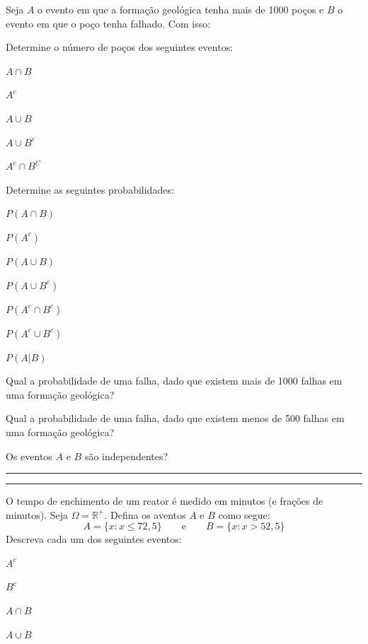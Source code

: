\documentclass[a4paper,11pt,fleqn]{article}\usepackage[]{graphicx}\usepackage[]{color}
\theoremstyle{definition}
\begin{document}
\begin{compactenum}
  Seja $A$ o evento em que a formação geológica tenha mais de 1000 poços
  e $B$ o evento em que o poço tenha falhado. Com isso:
  \begin{compactenum}
  \item Determine o número de poços dos seguintes eventos: \\
    \begin{inparaenum}
    \item $A \cap B$ \,
    \item $A^c$ \,
    \item $A \cup B$ \,
    \item $A \cup B^c$ \,
    \item $A^c \cap B^C$
    \end{inparaenum}
  \item Determine as seguintes probabilidades: \\
    \begin{inparaenum}
    \item $P(A \cap B)$ \,
    \item $P(A^c)$ \,
    \item $P(A \cup B)$ \,
    \item $P(A \cup B^c)$ \,
    \item $P(A^c \cap B^c)$ \,
    \item $P(A^c \cup B^c)$ \,
    \item $P(A|B)$
    \end{inparaenum}
  \item Qual a probabilidade de uma falha, dado que existem mais de 1000
    falhas em uma formação geológica?
  \item Qual a probabilidade de uma falha, dado que existem menos de 500
    falhas em uma formação geológica?
  \item Os eventos $A$ e $B$ são independentes?
  \end{compactenum}

\vspace{0.3cm}
\hrule
\vspace{0.3cm}

\clearpage

\vspace{0.3cm}
\hrule
\vspace{0.3cm}

\item O tempo de enchimento de um reator é medido em minutos (e frações
  de minutos). Seja $\Omega = \mathbb{R}^{+}$. Defina os aventos $A$ e
  $B$ como segue:
  \begin{equation*}
    A = \{x : x \leq 72,5\} \qquad \text{e} \qquad B = \{x : x > 52,5\}
  \end{equation*}
  Descreva cada um dos seguintes eventos: \\
  \begin{inparaenum}
  \item $A^{c}$ \,
  \item $B^{c}$ \,
  \item $A \cap B$ \,
  \item $A \cup B$
  \end{inparaenum}


\end{compactenum}
\end{document}

